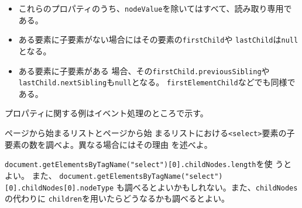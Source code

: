 \iffalse
なお、DOM4\footnote{\texttt{http://www.w3.org/TR/domcore/}}とは2015年11月現在
W3Cが定める次の DOM の規格の Proposed Recommendation(勧告案) である。
DOM の規格は今までに Level 1 から Level 3 までが Recommendation(勧告) と
なっている。
\fi
\begin{itemize}
 \item これらのプロパティのうち、\texttt{nodeValue}を除いてはすべて、読み取り専用である。
 \item ある要素に子要素がない場合にはその要素の\texttt{firstChild}や
\texttt{lastChild}は\texttt{null}となる。
 \item ある要素に子要素がある
場合、その\texttt{firstChild.previousSibling}や
\texttt{lastChild.nextSibling}も\texttt{null}となる。
       \texttt{firstElementChild}などでも同様である。
\end{itemize}

プロパティに関する例はイベント処理のところで示す。
\begin{Prob}\upshape
 \pageref{pulldown1}ページから始まるリストと\pageref{pulldown2}ページから始
 まるリストにおける\texttt{<select>}要素の子要素の数を調べよ。異なる場合にはその理由
 を述べよ。

 \texttt{document.getElementsByTagName("select")[0].childNodes.length}を使
 うとよい。
%
また、
 \texttt{document.getElementsByTagName("select")[0].childNodes[0].nodeType}
 も調べるとよいかもしれない。また、\texttt{childNodes}の代わりに
 \texttt{children}を用いたらどうなるかも調べるとよい。
\end{Prob}


